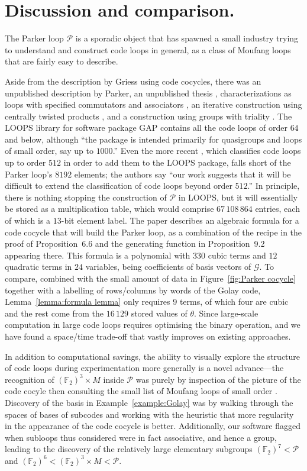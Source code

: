 \documentclass{article}
\theoremstyle{plain}
\theoremstyle{definition}
\def \cG {\mathcal{G}}
\def \cP {\mathcal{P}}
\def \FF {\mathbb{F}}
\begin{document}
\section{Discussion and comparison.}\label{sec:discussion}

The Parker loop $\cP$ is a sporadic object that has spawned a small industry trying to understand and construct code loops in general, as a class of Moufang loops that are fairly easy to describe.

Aside from the description by Griess using code cocycles, there was an unpublished description by Parker, an unpublished thesis \cite{Johnson}, characterizations as loops with specified commutators and associators \cite{CheinGoodaire}, an iterative construction using centrally twisted products \cite{Hsu}, and a construction using groups with triality \cite{Nagy}. 
The LOOPS library \cite{LOOPS} for software package GAP \cite{GAP4} contains all the code loops of order $64$ and below, although ``the package is intended primarily for quasigroups and loops of small order, say up to $1000$.''
Even the more recent \cite{OBrien_Vojtechovsky}, which classifies code loops up to order $512$ in order to add them to the LOOPS package, falls short of the Parker loop's $8192$ elements; the authors say ``our work suggests that it will be difficult to extend the classification of code loops beyond order $512$.''
In principle, there is nothing stopping the construction of $\cP$ in LOOPS, but it will essentially be stored as a multiplication table, which would comprise $67\,108\,864$ entries, each of which is a $13$-bit element label.
The paper \cite{Morier-Genoud_Ovsienko} describes an algebraic formula for a code cocycle that will build the Parker loop, as a combination of the recipe in the proof of Proposition~6.6 and the generating function in Proposition~9.2 appearing there.
This formula is a polynomial with $330$ cubic terms and $12$ quadratic terms in $24$ variables, being coefficients of basis vectors of $\cG$. 
To compare, combined with the small amount of data in Figure~\ref{fig:Parker cocycle} together with a labelling of rows/columns by words of the Golay code, Lemma~\ref{lemma:formula lemma} only requires 9 terms, of which four are cubic and the rest come from the $16\,129$ stored values of $\theta$.
Since large-scale computation in large code loops requires optimising the binary operation, and we have found a space/time trade-off that vastly improves on existing approaches.

In addition to computational savings, the ability to visually explore the structure of code loops during experimentation more generally is a novel advance---the recognition of $(\FF_2)^3\times M$ inside $\cP$ was purely by inspection of the picture of the code cocyle then consulting the small list of Moufang loops of small order \cite{Chein}.
Discovery of the basis in Example~\ref{example:Golay} was by walking through the spaces of bases of subcodes and working with the heuristic that more regularity in the appearance of the code cocycle is better.
Additionally, our software flagged when subloops thus considered were in fact associative, and hence a group, leading to the discovery of the relatively large elementary subgroups $(\FF_2)^7 < \cP$ and $(\FF_2)^6 < (\FF_2)^3\times M < \cP$. 
\end{document}
